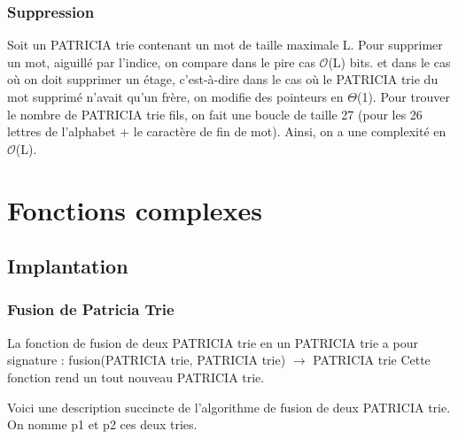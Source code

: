 \documentclass[a4paper,12pt]{report}
\begin{document}
\subsection{Suppression}
Soit un PATRICIA trie contenant un mot de taille maximale L. Pour supprimer un mot, aiguillé par l'indice, on compare dans le pire cas $\mathcal{O}$(L) bits. et dans le cas où on doit supprimer un étage, c'est-à-dire dans le cas où le PATRICIA trie du mot supprimé n'avait qu'un frère, on modifie des pointeurs en $\Theta$(1). Pour trouver le nombre de PATRICIA trie fils, on fait une boucle de taille 27 (pour les 26 lettres de l'alphabet + le caractère de fin de mot). Ainsi, on a une complexité en  $\mathcal{O}$(L).


\chapter{Fonctions complexes}
\section{Implantation}
\subsection{Fusion de Patricia Trie}

La fonction de fusion de deux PATRICIA trie en un PATRICIA trie a pour signature : fusion(PATRICIA trie, PATRICIA trie) $\rightarrow$ PATRICIA trie
Cette fonction rend un tout nouveau PATRICIA trie.

Voici une description succincte de l'algorithme de fusion de deux PATRICIA trie.
On nomme p1 et p2 ces deux tries.
\end{document}
